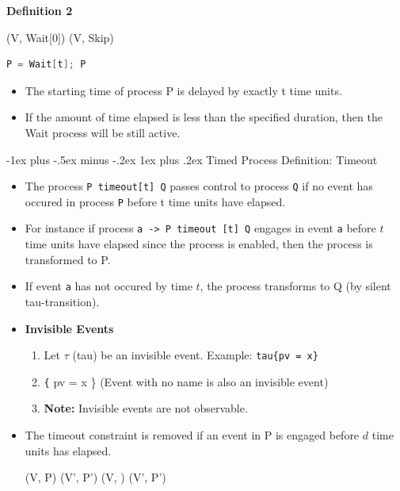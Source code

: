 \documentclass[10pt, landscape]{article}
\makeatletter
\renewcommand{\subsubsection}{\@startsection{subsubsection}{3}{0mm}%
  {-1ex plus -.5ex minus -.2ex}%
  {1ex plus .2ex}%
{\normalfont\small\bfseries}}%
\makeatother
\begin{document}
\begin{multicols*}{3}
  \textbf{Definition 2}
  \begin{axdef}
    \where
    (V, Wait[0]) \xrightarrow{\tau} (V, Skip)
  \end{axdef}
  \begin{lstlisting}[language=C]
  P = Wait[t]; P
  \end{lstlisting}
  \begin{itemize}
    \item The starting time of process P is delayed by exactly t time units.
    \item If the amount of time elapsed is less than the specified duration, then the Wait process will be still active.
  \end{itemize}
 
  \subsubsection{Timed Process Definition: Timeout}
  \begin{itemize}
    \item The process \texttt{P timeout[t] Q} passes control to process \texttt{Q} if no event has occured in process \texttt{P} before t time units have elapsed.
    \item For instance if process \texttt{a -> P timeout [t] Q} engages in event \texttt{a} before $t$ time units have elapsed since the process is enabled, then the process is transformed to P.
    \item If event \texttt{a} has not occured by time $t$, the process transforms to Q (by silent tau-transition).
    \item \textbf{Invisible Events}
    \begin{enumerate}
      \item Let $\tau$ (tau) be an invisible event. Example: \texttt{tau\{pv = x\}}
      \item \texttt\{ pv = x \} (Event with no name is also an invisible event)
      \item \textbf{Note:} Invisible events are not observable.
    \end{enumerate}
    \item The timeout constraint is removed if an event in P is engaged before $d$ time units has elapsed.
    \begin{footnotesize}
        \begin{axdef}
            (V, P)  (V', P')
            \where
            (V, )  (V', P')
        \end{axdef}

\end{footnotesize}
\end{itemize}
\end{multicols*}
\end{document}
